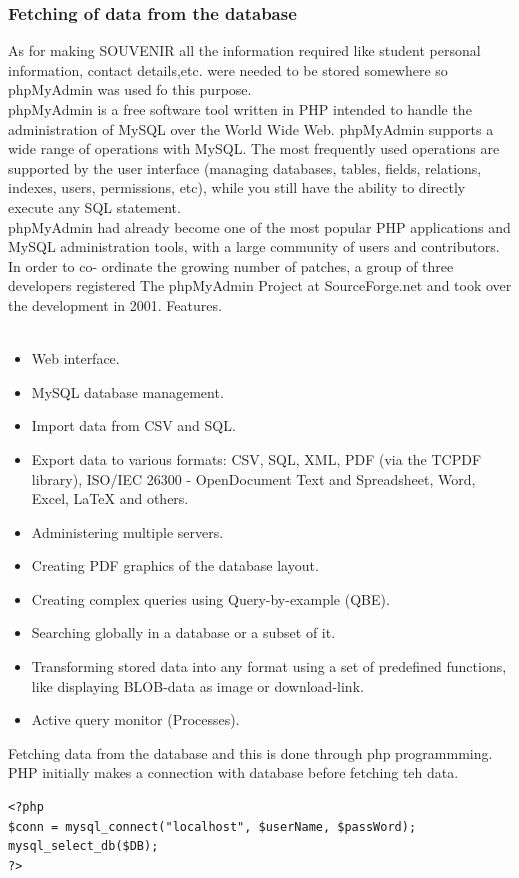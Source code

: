 \subsubsection{Fetching of data from the database}
As for making SOUVENIR all the information required like student personal information, contact details,etc. were needed to be stored somewhere so phpMyAdmin was used
fo this purpose.\\
phpMyAdmin is a free software tool written in PHP intended to handle the\\
administration of MySQL over the World Wide Web. phpMyAdmin supports a wide range of operations with MySQL. The most frequently used operations are supported by the user interface (managing databases, tables, fields, relations, indexes, users, permissions, etc), while you still have the ability to directly execute any SQL statement.\\
phpMyAdmin had already become one of the most popular PHP applications and MySQL administration tools, with a large community of users and contributors. In order to co-
ordinate the growing number of patches, a group of three developers registered The phpMyAdmin Project at SourceForge.net and took over the development in 2001.
Features.\\\\
\begin{itemize}
\item Web interface.
\item MySQL database management.
\item Import data from CSV and SQL.
\item Export data to various formats: CSV, SQL, XML, PDF (via the TCPDF library), ISO/IEC 26300 - OpenDocument Text and Spreadsheet, Word, Excel, \LaTeX{} and others.
\item Administering multiple servers.
\item Creating PDF graphics of the database layout.
\item Creating complex queries using Query-by-example (QBE).
\item Searching globally in a database or a subset of it.
\item Transforming stored data into any format using a set of predefined functions, like displaying BLOB-data as image or download-link.
\item Active query monitor (Processes).
\end{itemize}
Fetching data from the database and this is done through php programmming. PHP initially makes a connection with database before fetching teh data.
\begin{verbatim}
<?php
$conn = mysql_connect("localhost", $userName, $passWord);
mysql_select_db($DB);
?>
\end{verbatim}
